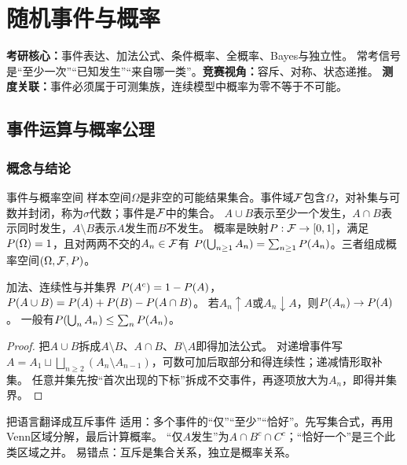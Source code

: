 \chapter{随机事件与概率}\label{ch:01}
\begin{examtip}
\textbf{考研核心：}事件表达、加法公式、条件概率、全概率、Bayes与独立性。
常考信号是“至少一次”“已知发生”“来自哪一类”。\textbf{竞赛视角：}容斥、对称、状态递推。
\textbf{测度关联：}事件必须属于可测集族，连续模型中概率为零不等于不可能。
\end{examtip}

\section{事件运算与概率公理}\label{sec:11}
\subsection{概念与结论}
\begin{definition}{事件与概率空间}
样本空间$\Omega$是非空的可能结果集合。事件域$\mathcal F$包含$\Omega$，对补集与可数并封闭，称为$\sigma$代数；事件是$\mathcal F$中的集合。
$A\cup B$表示至少一个发生，$A\cap B$表示同时发生，$A\setminus B$表示$A$发生而$B$不发生。
概率是映射$P:\mathcal F\to[0,1]$，满足$P(\Omega)=1$，且对两两不交的$A_n\in\mathcal F$有
$P(\bigcup_{n\ge1}A_n)=\sum_{n\ge1}P(A_n)$。三者组成概率空间$(\Omega,\mathcal F,P)$。
\end{definition}
\begin{theorem}{加法、连续性与并集界}
$P(A^c)=1-P(A)$，$P(A\cup B)=P(A)+P(B)-P(A\cap B)$。
若$A_n\uparrow A$或$A_n\downarrow A$，则$P(A_n)\to P(A)$。
一般有$P(\bigcup_n A_n)\le\sum_nP(A_n)$。
\end{theorem}
\begin{proof}
把$A\cup B$拆成$A\setminus B$、$A\cap B$、$B\setminus A$即得加法公式。
对递增事件写$A=A_1\sqcup\bigsqcup_{n\ge2}(A_n\setminus A_{n-1})$，可数可加后取部分和得连续性；递减情形取补集。
任意并集先按“首次出现的下标”拆成不交事件，再逐项放大为$A_n$，即得并集界。
\end{proof}
\begin{method}{把语言翻译成互斥事件}
适用：多个事件的“仅”“至少”“恰好”。先写集合式，再用Venn区域分解，最后计算概率。
“仅$A$发生”为$A\cap B^c\cap C^c$；“恰好一个”是三个此类区域之并。
易错点：互斥是集合关系，独立是概率关系。
\end{method}
